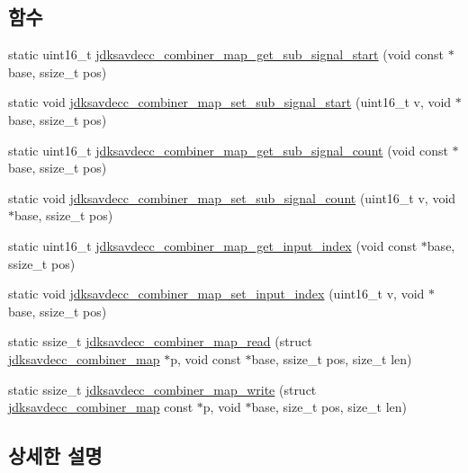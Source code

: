 \subsection*{함수}
\begin{DoxyCompactItemize}
\item 
static uint16\+\_\+t \hyperlink{group__combiner__map_ga6fc714266d520b02ce08e4fe19abba4b}{jdksavdecc\+\_\+combiner\+\_\+map\+\_\+get\+\_\+sub\+\_\+signal\+\_\+start} (void const $\ast$base, ssize\+\_\+t pos)
\item 
static void \hyperlink{group__combiner__map_ga8a383db47249225d368559146eb72370}{jdksavdecc\+\_\+combiner\+\_\+map\+\_\+set\+\_\+sub\+\_\+signal\+\_\+start} (uint16\+\_\+t v, void $\ast$base, ssize\+\_\+t pos)
\item 
static uint16\+\_\+t \hyperlink{group__combiner__map_gacba61126bd088c4b3975bb72e85b0cd0}{jdksavdecc\+\_\+combiner\+\_\+map\+\_\+get\+\_\+sub\+\_\+signal\+\_\+count} (void const $\ast$base, ssize\+\_\+t pos)
\item 
static void \hyperlink{group__combiner__map_ga4932f14c6121e313f87b79fa22fcb54c}{jdksavdecc\+\_\+combiner\+\_\+map\+\_\+set\+\_\+sub\+\_\+signal\+\_\+count} (uint16\+\_\+t v, void $\ast$base, ssize\+\_\+t pos)
\item 
static uint16\+\_\+t \hyperlink{group__combiner__map_ga816da67b1dd4de7c120a82fda698721b}{jdksavdecc\+\_\+combiner\+\_\+map\+\_\+get\+\_\+input\+\_\+index} (void const $\ast$base, ssize\+\_\+t pos)
\item 
static void \hyperlink{group__combiner__map_gafb17498728c6c890ff4fa085d86e7c0c}{jdksavdecc\+\_\+combiner\+\_\+map\+\_\+set\+\_\+input\+\_\+index} (uint16\+\_\+t v, void $\ast$base, ssize\+\_\+t pos)
\item 
static ssize\+\_\+t \hyperlink{group__combiner__map_ga32ab325a9c82fcd390569331cc6e1f13}{jdksavdecc\+\_\+combiner\+\_\+map\+\_\+read} (struct \hyperlink{structjdksavdecc__combiner__map}{jdksavdecc\+\_\+combiner\+\_\+map} $\ast$p, void const $\ast$base, ssize\+\_\+t pos, size\+\_\+t len)
\item 
static ssize\+\_\+t \hyperlink{group__combiner__map_ga3fdac5478ae6822f5665e50997573af8}{jdksavdecc\+\_\+combiner\+\_\+map\+\_\+write} (struct \hyperlink{structjdksavdecc__combiner__map}{jdksavdecc\+\_\+combiner\+\_\+map} const $\ast$p, void $\ast$base, size\+\_\+t pos, size\+\_\+t len)
\end{DoxyCompactItemize}


\subsection{상세한 설명}


